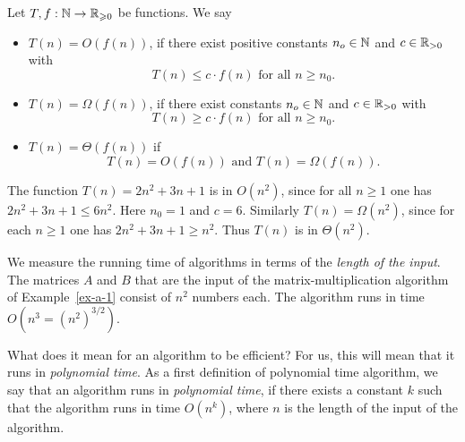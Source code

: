 \begin{definition}[$O$-notation]  

 Let $T,f: \mathbb{N} \to \mathbb{R}_{\geqslant0}$ be functions. We say 
  \begin{itemize}
  \item \emph{$T(n) = O(f(n))$}, if there exist positive  constants
    $n_o\in \mathbb{N}$ and  $c\in\mathbb{R}_{>0}$ 
    with $$T(n) \leq c \cdot f(n) \text{ for all }n\geq n_0.$$  
  \item \emph{$T(n) = \Omega(f(n))$}, if there exist constants   $n_o\in \mathbb{N}$
    and  $c\in\mathbb{R}_{>0}$ 
    with $$T(n) \geq c \cdot f(n)\text{ for all } n\geq n_0.$$
  \item \emph{$T(n) = \Theta(f(n))$}  if $$T(n)=O(f(n))\text{ and }
     T(n) = \Omega(f(n)).$$
  \end{itemize}
\end{definition}


\begin{example}
  The function $T(n)=2n^2 + 3n +1$ is in $O(n^2)$, since for all
  $n\geq1$ one has $2n^2 + 3n + 1 \leq 6n^2$. Here $n_0 = 1$ and $c =
  6$.  Similarly $T(n) = \Omega(n^2)$, since for each $n\geq1$ one has $2n^2 + 3n
  +1\geq n^2$. Thus $T(n)$ is in $\Theta(n^2)$. 
\end{example}

We measure the running time of algorithms in terms of the \emph{length
  of the input}.  The matrices $A$ and $B $ that are the input of the matrix-multiplication
algorithm of Example~\ref{ex-a-1} consist of $n^2$ 
numbers each. The algorithm runs in time $O(n^3 = (n^2)^{3/2})$. 


What does it mean for an algorithm to be efficient? For us, this will
mean that it runs in \emph{polynomial time}. As a first definition of
polynomial time algorithm, we say that an algorithm runs in
\emph{polynomial time}, if there exists a constant $k$ such that the
algorithm runs in time $O(n^k)$, where $n$ is the length of the input
of the algorithm.

